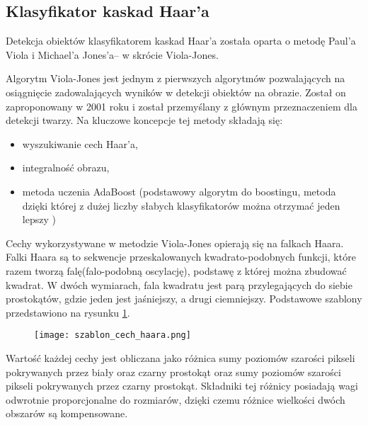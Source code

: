 \subsection{Klasyfikator kaskad Haar'a} \label{haar}
Detekcja obiektów klasyfikatorem kaskad Haar'a została oparta o metodę Paul'a Viola i Michael'a Jones'a– w skrócie Viola-Jones.

Algorytm Viola-Jones jest jednym z pierwszych algorytmów pozwalających na osiągnięcie zadowalających wyników w detekcji obiektów na obrazie. Został on zaproponowany w 2001 roku i został przemyślany z głównym przeznaczeniem dla detekcji twarzy. Na kluczowe koncepcje tej metody składają się:
\begin{itemize}
\item wyszukiwanie cech Haar'a,
\item integralność obrazu,
\item metoda uczenia AdaBoost (podstawowy algorytm do boostingu, metoda dzięki której z dużej liczby słabych klasyfikatorów można otrzymać jeden lepszy )
\end{itemize}

Cechy wykorzystywane w metodzie Viola-Jones opierają się na falkach Haara. Falki Haara są to sekwencje przeskalowanych kwadrato-podobnych funkcji, które razem tworzą falę(falo-podobną oscylację), podstawę z której można zbudować kwadrat. W dwóch wymiarach, fala kwadratu jest parą przylegających do siebie prostokątów, gdzie jeden jest jaśniejszy, a drugi ciemniejszy. Podstawowe szablony przedstawiono na rysunku \ref{fig:szablon_cech_haara}.
\begin{figure}[H]
	\centering
	\texttt{[image: szablon\_cech\_haara.png]}
	\label{fig:szablon_cech_haara}
\end{figure}
Wartość każdej cechy jest obliczana jako różnica sumy poziomów szarości pikseli pokrywanych przez biały oraz czarny prostokąt oraz sumy poziomów szarości pikseli pokrywanych przez czarny prostokąt. Składniki tej różnicy posiadają wagi odwrotnie proporcjonalne do rozmiarów, dzięki czemu różnice wielkości dwóch obszarów są kompensowane.

